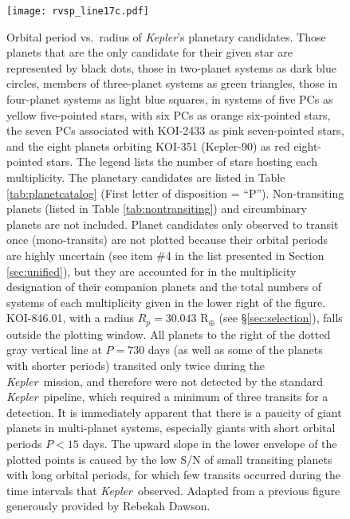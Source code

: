 \documentclass{aastex62}
\newcommand{\ikt}{{\it Kepler}}
\newcommand{\ik}{{\it Kepler~}}
\begin{document}
\begin{figure}[!hbt]
\texttt{[image: rvsp\_line17c.pdf]}
\caption{Orbital period vs.~radius of \ikt's planetary candidates.  Those planets that are the only candidate for their given star are represented by black dots, those in two-planet systems as dark blue circles, members of three-planet systems as green triangles, those in four-planet systems as light blue squares, in systems of five PCs as yellow five-pointed stars, with six PCs as orange six-pointed stars, the seven PCs associated with KOI-2433 as pink seven-pointed stars, and the eight planets orbiting KOI-351 (Kepler-90) as red eight-pointed stars. The legend lists the number of stars hosting each multiplicity. The planetary candidates are listed in Table \ref{tab:planetcatalog} (First letter of disposition = ``P''). %
Non-transiting planets (listed in Table \ref{tab:nontransiting}) and circumbinary planets are not included. Planet candidates only observed to transit once (mono-transits) are not plotted because their orbital periods are highly uncertain (see item \#4 in the list presented in Section \ref{sec:unified}), but they are accounted for in the multiplicity designation of their companion planets and the total numbers of systems of each multiplicity given in the lower right of the figure. KOI-846.01, with a radius $R_p=30.043$ R$_\oplus$ (see \S\ref{sec:selection}), falls outside the plotting window. All planets to the right of the dotted gray vertical line at $P = 730$ days (as well as some of the planets with shorter periods) transited only twice during the \ik mission, and therefore were not detected by the standard \ik pipeline, which required a minimum of three transits for a detection.  It is immediately apparent that there is a paucity of giant planets in multi-planet systems, especially giants with short orbital periods $P<15$ days.  The upward slope in the lower envelope of the plotted points is caused by the low S/N of small transiting planets with long orbital periods, for which few transits occurred during the time intervals that \ik observed. Adapted from a previous figure generously provided by Rebekah Dawson. }
\label{fig:perrad}
\end{figure}
\end{document}
